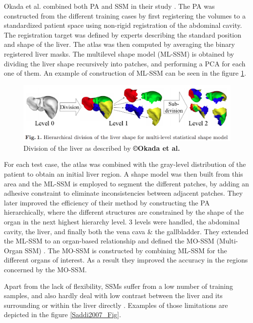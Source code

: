 \documentclass[]{article}
\begin{document}
	Okada et al. combined both PA and SSM in their study \cite{Okada2008}. The PA was
	constructed from the different training cases by first registering the
	volumes to a standardized patient space using non-rigid registration of
	the abdominal cavity. The registration target was defined by experts
	describing the standard position and shape of the liver. The atlas was
	then computed by averaging the binary registered liver masks. The
	multilevel shape model (ML-SSM) is obtained by dividing the liver shape
	recursively into patches, and performing a PCA for each one of them. An
	example of construction of ML-SSM can be seen in the figure \ref{Okada2008_Fig1}.
	
	\begin{figure}[th!]
		\centering
		\includegraphics[width=0.7\linewidth]{images/image38}
		\caption{Division of the liver as described by \textbf{©Okada et al.} \cite{Okada2008}}
		\label{Okada2008_Fig1}
	\end{figure}
	
	
	
	For each test case, the atlas was combined with the gray-level
	distribution of the patient to obtain an initial liver region. A shape
	model was then built from this area and the ML-SSM is employed to
	segment the different patches, by adding an adhesive constraint to
	eliminate inconsistencies between adjacent patches. They later improved
	the efficiency of their method by constructing the PA hierarchically,
	where the different structures are constrained by the shape of the organ
	in the next highest hierarchy level. 3 levels were handled, the
	abdominal cavity, the liver, and finally both the vena cava \& the
	gallbladder. They extended the ML-SSM to an organ-based relationship and
	defined the MO-SSM (Multi-Organ SSM) \cite{Okada2008}. The MO-SSM is constructed by combining ML-SSM for the
	different organs of interest. As a result they improved the accuracy in
	the regions concerned by the MO-SSM.
	
	
	Apart from the lack of flexibility, SSMs suffer from a low number of
	training samples, and also hardly deal with low contrast between the
	liver and its surrounding or within the liver directly \cite{Saddi2007, Lamecker2004}. Examples of those limitations are depicted in the figure \ref{Saddi2007_Fig}.
	
\end{document}

